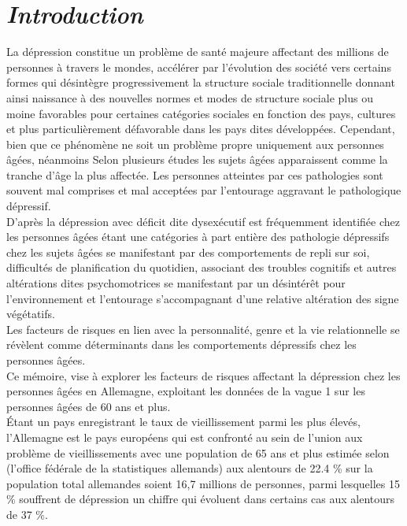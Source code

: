 \documentclass[a4paper]{article}
\begin{document}
	\newpage
	

		
		
		\section{\textit{Introduction}}
		
		La dépression constitue un problème de santé majeure affectant des millions de personnes à travers le mondes, accélérer par l’évolution des société vers certains formes qui désintègre progressivement la structure sociale traditionnelle donnant ainsi naissance à des nouvelles normes et modes de structure sociale plus ou moine favorables pour certaines catégories sociales en fonction des pays, cultures et plus particulièrement défavorable dans les pays dites développées.
		Cependant, bien que ce phénomène ne soit  un problème propre uniquement aux personnes âgées, néanmoins Selon plusieurs études les sujets âgées apparaissent comme la tranche d’âge la plus affectée. Les personnes atteintes par ces pathologies sont souvent mal comprises et mal acceptées par l’entourage  aggravant le pathologique dépressif. \\
		  
		D’après \citep{Thomas2017} la dépression avec déficit dite dysexécutif est fréquemment identifiée chez les personnes âgées étant une catégories à part entière des pathologie dépressifs chez les sujets âgées se manifestant par des comportements de repli sur soi, difficultés de planification du quotidien, associant des troubles cognitifs et autres altérations dites  psychomotrices se manifestant par un désintérêt pour l’environnement et l’entourage s’accompagnant d’une relative altération des signe végétatifs.\\
		
		Les facteurs de risques  en lien avec la  personnalité, genre et la vie relationnelle se révèlent comme déterminants dans les comportements dépressifs chez les personnes âgées.\\
		Ce mémoire, vise à explorer les facteurs de risques affectant la dépression  chez les personnes âgées en Allemagne, exploitant les données de la vague 1 sur les personnes âgées de 60 ans et plus.\\
		Étant un pays enregistrant le taux de vieillissement parmi les plus élevés, l’Allemagne est le pays européens qui est confronté au sein de l’union aux problème de vieillissements avec une population de 65 ans et plus estimée selon (l’office fédérale de la statistiques allemands) aux alentours de 22.4 \% sur la population total allemandes soient 16,7 millions de personnes, parmi lesquelles 15 \% souffrent de dépression un chiffre qui évoluent dans certains cas aux alentours de 37 \%. \\
		
\end{document}
